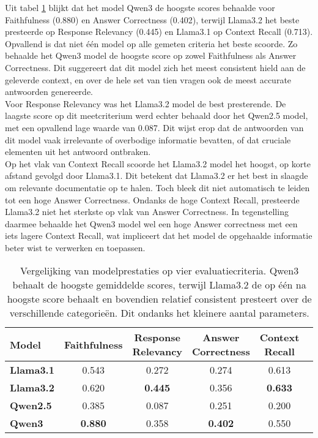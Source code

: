 Uit tabel \ref{tab:modelvergelijking} blijkt dat het model Qwen3 de hoogste scores behaalde voor Faithfulness (0.880) en Answer Correctness (0.402), terwijl Llama3.2 het beste presteerde op Response Relevancy (0.445) en Llama3.1 op Context Recall (0.713). 
\\[1em]
Opvallend is dat niet één model op alle gemeten criteria het beste scoorde. Zo behaalde het Qwen3 model de hoogste score op zowel Faithfulness als Answer Correctness. Dit suggereert dat dit model zich het meest consistent hield aan de geleverde context, en over de hele set van tien vragen ook de meest accurate antwoorden genereerde.
\\[1em]
Voor Response Relevancy was het Llama3.2 model de best presterende. De laagste score op dit meetcriterium werd echter behaald door het Qwen2.5 model, met een opvallend lage waarde van 0.087. Dit wijst erop dat de antwoorden van dit model vaak irrelevante of overbodige informatie bevatten, of dat cruciale elementen uit het antwoord ontbraken.
\\[1em]
Op het vlak van Context Recall scoorde het Llama3.2 model het hoogst, op korte afstand gevolgd door Llama3.1. Dit betekent dat Llama3.2 er het best in slaagde om relevante documentatie op te halen. Toch bleek dit niet automatisch te leiden tot een hoge Answer Correctness. Ondanks de hoge Context Recall, presteerde Llama3.2 niet het sterkste op vlak van Answer Correctness. In tegenstelling daarmee behaalde het Qwen3 model wel een hoge Answer correctness met een iets lagere Context Recall, wat impliceert dat het model de opgehaalde informatie beter wist te verwerken en toepassen.

\begin{table}[H]
    \begin{tabular}{|l|c|c|c|c|c|}
        \hline
        \textbf{Model} & \textbf{Faithfulness} & \textbf{Response Relevancy} & \textbf{Answer Correctness} & \textbf{Context Recall} \\
        \hline
        \textbf{Llama3.1} & 0.543 & 0.272 & 0.274 & 0.613 \\
        \textbf{Llama3.2} & 0.620 & \textbf{0.445} & 0.356 & \textbf{0.633} \\
        \textbf{Qwen2.5}  & 0.385 & 0.087 & 0.251 & 0.200 \\
        \textbf{Qwen3}    & \textbf{0.880} & 0.358 & \textbf{0.402} & 0.550 \\
        \hline
    \end{tabular}
    \caption{Vergelijking van modelprestaties op vier evaluatiecriteria. Qwen3 behaalt de hoogste gemiddelde scores, terwijl Llama3.2 de op één na hoogste score behaalt en bovendien relatief consistent presteert over de verschillende categorieën. Dit ondanks het kleinere aantal parameters.}
    \label{tab:modelvergelijking}
\end{table}


